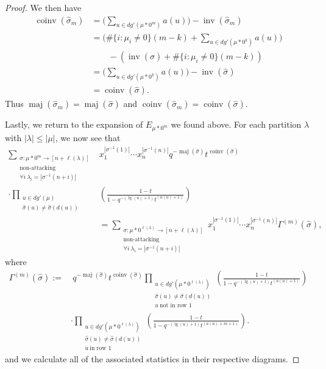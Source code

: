 \documentclass[ALCO,Unicode]{cedram}
\DeclareMathOperator{\maj}{maj}
\DeclareMathOperator{\inv}{inv}
\DeclareMathOperator{\coinv}{coinv}
\DeclareMathOperator{\mathleg}{lg}
\begin{document}
\begin{proof}
We then have 
\begin{align*}
    \coinv(\widehat{\sigma}_m)&= \bigg( \sum_{u \in dg'(\mu * 0^m)} a(u) \bigg) - \inv(\widehat{\sigma}_m) \\
    &= \bigg(\#\{i:\mu_i \neq 0\}(m-k) + \sum_{u \in dg'(\mu*0^k)} a(u)\bigg) \\ & \qquad - \left( \inv(\widehat{\sigma}) + \#\{i:\mu_i \neq 0\}(m-k)\right)\\
    & = \bigg( \sum_{u \in dg'(\mu*0^k)} a(u)\bigg) - \inv(\widehat{\sigma}) \\
    &= \coinv(\widehat{\sigma}).
\end{align*}
  Thus $\maj(\widehat{\sigma}_m) = \maj(\widehat{\sigma})$ and $\coinv(\widehat{\sigma}_m)= \coinv(\widehat{\sigma}).$

Lastly, we return to the expansion of $E_{\mu*0^m}$ we found above. For each partition $\lambda$ with $|\lambda| \leq |\mu|$, we now see that 
\begin{align*}
     \sum_{\substack{\sigma:\mu* 0^m \rightarrow [n+\ell(\lambda)]\\ \text{non-attacking} \\ \forall i ~ \lambda_i = |\sigma^{-1}(n+i)|}} & x_1 ^{|\sigma^{-1}(1)|}\cdots x_n ^{|\sigma^{-1}(n)|} q^{-\maj(\widehat{\sigma})}t^{\coinv(\widehat{\sigma})} \\
      \cdot \prod_{\substack{u \in dg'(\mu) \\ \widehat{\sigma}(u) \neq \widehat{\sigma}(d(u))}} & \left( \frac{1-t}{1-q^{-(\mathleg(u)+1)}t^{(a(u)+1)}} \right) \\
     & = \sum_{\substack{\sigma:\mu* 0^{\ell(\lambda)} \rightarrow [n+\ell(\lambda)]\\ \text{non-attacking} \\ \forall i ~ \lambda_i = |\sigma^{-1}(n+i)|}} x_1 ^{|\sigma^{-1}(1)|}\cdots x_n ^{|\sigma^{-1}(n)|} \Gamma^{(m)}(\widehat{\sigma}),
\end{align*}
where
\begin{align*}
    \Gamma^{(m)}(\widehat{\sigma}) := &\ {} q^{-\maj(\widehat{\sigma})}t^{\coinv(\widehat{\sigma})} \prod_{\substack{ u \in dg'(\mu * 0^{\ell(\lambda)}) \\ \widehat{\sigma}(u) \neq \widehat{\sigma}(d(u)) \\ u ~ \text{not in row } 1 }} \left( \frac{1-t}{1-q^{-(\mathleg(u)+1)}t^{(a(u)+1)}} \right) \\
    & \cdot {} \prod_{\substack{ u \in dg'(\mu * 0^{\ell(\lambda)}) \\ \widehat{\sigma}(u) \neq \widehat{\sigma}(d(u)) \\ u ~ \text{in row } 1 }} \left( \frac{1-t}{1-q^{-(\mathleg(u) +1)}t^{(a(u) + m + 1)}} \right).
\end{align*}
and we calculate all of the associated statistics in their respective diagrams.
 \end{proof}
\end{document}
